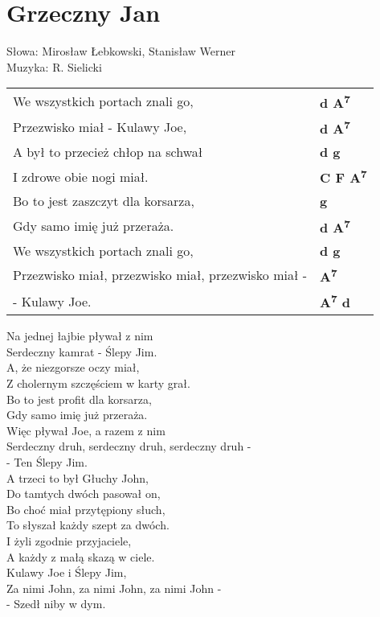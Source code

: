 \section{Grzeczny Jan}

Słowa: Mirosław Łebkowski, Stanisław Werner\\
Muzyka: R. Sielicki

\vspace{2em}
\begin{tabular}{@{}p{9cm}@{}l@{}}
We wszystkich portach znali go,  & \bfseries   d A\textsuperscript{7} \\
Przezwisko miał - Kulawy Joe,  & \bfseries   d A\textsuperscript{7} \\
A był to przecież chłop na schwał  & \bfseries   d g \\
I zdrowe obie nogi miał.  & \bfseries   C F A\textsuperscript{7} \\
Bo to jest zaszczyt dla korsarza,  & \bfseries   g \\
Gdy samo imię już przeraża.  & \bfseries   d A\textsuperscript{7} \\
We wszystkich portach znali go,  & \bfseries   d g \\
Przezwisko miał, przezwisko miał, przezwisko miał -  & \bfseries   A\textsuperscript{7} \\
- Kulawy Joe.  & \bfseries   A\textsuperscript{7} d \\
\end{tabular}

\vspace{1em}
Na jednej łajbie pływał z nim \\
Serdeczny kamrat - Ślepy Jim. \\
A, że niezgorsze oczy miał, \\
Z cholernym szczęściem w karty grał. \\
Bo to jest profit dla korsarza, \\
Gdy samo imię już przeraża. \\
Więc pływał Joe, a razem z nim \\
Serdeczny druh, serdeczny druh, serdeczny druh - \\
- Ten Ślepy Jim. \\

A trzeci to był Głuchy John, \\
Do tamtych dwóch pasował on, \\
Bo choć miał przytępiony słuch, \\
To słyszał każdy szept za dwóch. \\
I żyli zgodnie przyjaciele, \\
A każdy z małą skazą w ciele. \\
Kulawy Joe i Ślepy Jim, \\
Za nimi John, za nimi John, za nimi John - \\
- Szedł niby w dym. \\


